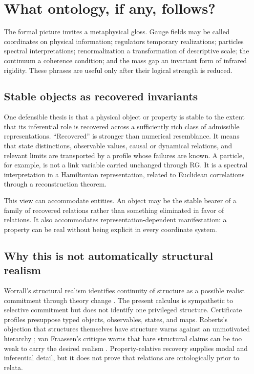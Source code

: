 \section{What ontology, if any, follows?}
\label{sec:ontology}

The formal picture invites a metaphysical gloss.  Gauge fields may be called
coordinates on physical information; regulators temporary realizations;
particles spectral interpretations; renormalization a transformation of
descriptive scale; the continuum a coherence condition; and the mass gap an
invariant form of infrared rigidity.  These phrases are useful only after
their logical strength is reduced.

\subsection{Stable objects as recovered invariants}

One defensible thesis is that a physical object or property is stable to the
extent that its inferential role is recovered across a sufficiently rich
class of admissible representations.  ``Recovered'' is stronger than
numerical resemblance.  It means that state distinctions, observable values,
causal or dynamical relations, and relevant limits are transported by a
profile whose failures are known.  A particle, for example, is not a link
variable carried unchanged through RG.  It is a spectral interpretation in a
Hamiltonian representation, related to Euclidean correlations through a
reconstruction theorem.

This view can accommodate entities.  An object may be the stable bearer of a
family of recovered relations rather than something eliminated in favor of
relations.  It also accommodates representation-dependent manifestation: a
property can be real without being explicit in every coordinate system.

\subsection{Why this is not automatically structural realism}

Worrall's structural realism identifies continuity of structure as a possible
realist commitment through theory change \cite{Worrall1989}.  The present
calculus is sympathetic to selective commitment but does not identify one
privileged structure.  Certificate profiles presuppose typed objects,
observables, states, and maps.  Roberts's objection that structures themselves
have structure warns against an unmotivated hierarchy
\cite{Roberts2011}; van Fraassen's critique warns that bare structural claims
can be too weak to carry the desired realism \cite{VanFraassen2006}.
Property-relative recovery supplies modal and inferential detail, but it does
not prove that relations are ontologically prior to relata.

